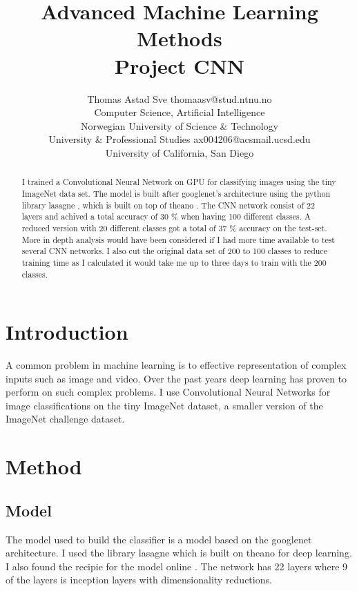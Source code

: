 \documentclass[twoside,11pt]{article}
\begin{document}
\title{Advanced Machine Learning Methods \\ Project CNN}

\author{\name Thomas Astad Sve \email thomaasv@stud.ntnu.no \\
         \addr Computer Science, Artificial Intelligence\\
       Norwegian University of Science \& Technology\\
       \addr University \& Professional Studies \email ax004206@acsmail.ucsd.edu\\
       University of California, San Diego\\}

\maketitle

\begin{abstract}
  I trained a Convolutional Neural Network on GPU for classifying images using the tiny ImageNet data set. The model is built after googlenet's \cite{googlenet} architecture using the python library lasagne \cite{lasagne}, which is built on top of theano \cite{theano}. The CNN network consist of 22 layers and achived a total accuracy of 30 \% when having 100 different classes. A reduced version with 20 different classes got a total of 37 \% accuracy on the test-set. More in depth analysis would have been considered if I had more time available to test several CNN networks. I also cut the original data set of 200 to 100 classes to reduce training time as I calculated it would take me up to three days to train with the 200 classes.
  
\end{abstract}
\section{Introduction}
A common problem in machine learning is to effective representation of complex inputs such as image and video. Over the past years deep learning has proven to perform on such complex problems. 
I use Convolutional Neural Networks for image classifications on the tiny ImageNet dataset, a smaller version of the ImageNet \cite{imagenet} challenge dataset.
\section{Method}
\subsection{Model}
The model used to build the classifier is a model based on the googlenet architecture. I used the library lasagne \cite{lasagne} which is built on theano for deep learning. I also found the recipie for the model online \cite{googlenet-recipe}. The network has 22 layers where 9 of the layers is inception layers with dimensionality reductions. 
\end{document}
